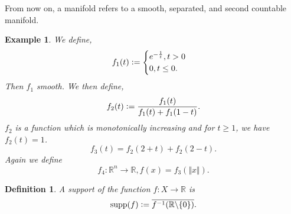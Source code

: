 \documentclass[10pt]{article}
\newtheorem{definition}{Definition}[section]
\newtheorem{example}{Example}[section]
\DeclareMathOperator{\supp}{supp}
\newcommand{\defeq}{\vcentcolon=}
\newcommand{\norm}[1]{\Vert #1 \Vert}
\newcommand{\R}[0]{\mathbb{R}}
\begin{document}
From now on, a manifold refers to a smooth, separated, and second countable manifold.
\begin{example}
  We define,
  \begin{equation*}
    f_1(t) \defeq \begin{cases}
      e^{-{\frac 1 t}}, t>0\\
      0, t\leq 0.
    \end{cases}
  \end{equation*}
  Then $f_1$ smooth. We then define,
  \begin{equation*}
    f_2(t)\defeq {\frac {f_1(t)} {f_1(t)+f_1(1-t)}}.
  \end{equation*}
  $f_2$ is a function which is monotonically increasing and for $t\geq 1$, we have $f_2(t) = 1$. 
  \begin{equation*}
    f_3(t) = f_2(2+t)+f_2(2-t).
  \end{equation*}
  Again we define
  \begin{equation*}
  f_4:\R^n\to\R, f(x) = f_3(\norm{x}).
  \end{equation*}
  \label{partition_of_unity_example}
\end{example}

\begin{definition}
  A support of the function $f:X\to\R$ is 
  \begin{equation*}
    \supp(f) \defeq \overline{f^{-1}(\R\backslash\{0\})}.
  \end{equation*} 
\end{definition}
\end{document}

